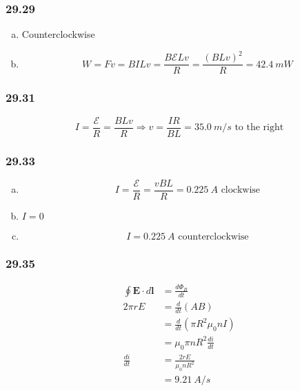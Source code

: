 \documentclass{article}
\begin{document}
\subsubsection{29.29}

\begin{enumerate}[(a)]
  \item Counterclockwise

  \item \[W = F v = B I L v = \frac{B \mathcal{E} L v}{R} = \frac{(B L v)^2}{R} = \qty{42.4}{mW}\]
\end{enumerate}

\subsubsection{29.31}

\[I = \frac{\mathcal{E}}{R} = \frac{B L v}{R} \Rightarrow v = \frac{I R}{B L} = \qty{35.0}{m/s}\text{ to the right}\]

\subsubsection{29.33}

\begin{enumerate}[(a)]
  \item \[I = \frac{\mathcal{E}}{R} = \frac{v B L}{R} = \qty{0.225}{A}\text{ clockwise}\]

  \item $I = 0$

  \item \[I = \qty{0.225}{A}\text{ counterclockwise}\]
\end{enumerate}

\subsubsection{29.35}

\begin{align*}
  \oint \mathbf{E} \cdot d \mathbf{l} & = \frac{d \Phi_B}{dt}              \\
  2 \pi r E                           & = \frac{d}{dt} (A B)               \\
                                      & = \frac{d}{dt} (\pi R^2 \mu_0 n I) \\
                                      & = \mu_0 \pi n R^2 \frac{di}{dt}    \\
  \frac{di}{dt}                       & = \frac{2 r E}{\mu_0 n R^2}        \\
                                      & = \qty{9.21}{A/s}
\end{align*}
\end{document}
